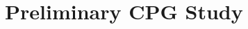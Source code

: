 \documentclass[aspectratio=169,10pt]{beamer}
\begin{document}





\section{Preliminary CPG Study}
\end{document}
